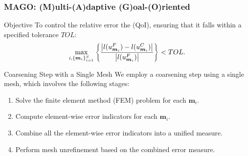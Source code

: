 \documentclass[10pt,aspectratio=169]{beamer}
\begin{document}
\begin{frame}
	\frametitle{MAGO: (M)ulti-(A)daptive (G)oal-(O)riented}
	
	\vspace{-1mm}	

\begin{block}{Objective}
	To control the relative error the  (QoI), ensuring that it falls within a specified tolerance $TOL$:
	\begin{equation}
		\max_{i, \{\boldsymbol{m}_i\}_{i=1}^S} \left\{ \frac{\left|l(u_{\boldsymbol{m}_i}^F)-l(u_{\boldsymbol{m}_i}^C)\right|}{\left|l(u_{\boldsymbol{m}_i}^F)\right|}\right\} < TOL.
	\end{equation}
\end{block}

\vspace{1mm}

\begin{block}{Coarsening Step with a Single Mesh}
	\vspace{2mm}
	We employ a coarsening step using a single mesh, which involves the following stages:
	\begin{enumerate}
		\item Solve the finite element method (FEM) problem for each $\boldsymbol{m}_i$.
		\item Compute element-wise error indicators for each $\boldsymbol{m}_i$.
		\item Combine all the element-wise error indicators into a unified measure.
		\item Perform mesh unrefinement based on the combined error measure.
	\end{enumerate}
\end{block}

\end{frame}
\end{document}
